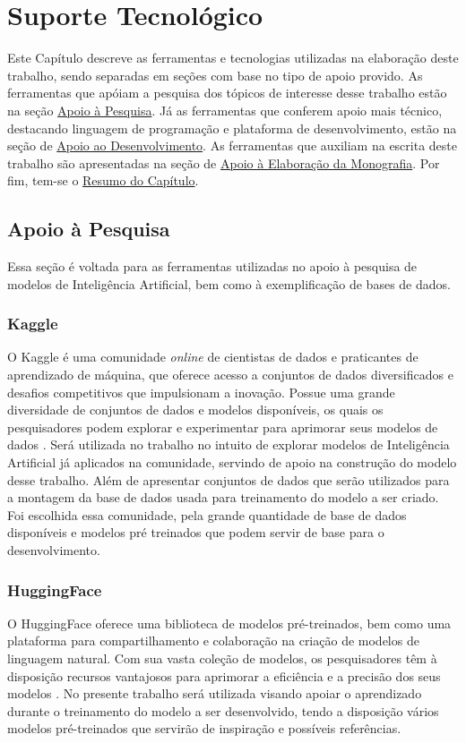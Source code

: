 \chapter[Suporte Tecnológico]{Suporte Tecnológico}

Este Capítulo descreve as ferramentas e tecnologias utilizadas na elaboração deste trabalho, sendo separadas
em seções com base no tipo de apoio provido. As ferramentas que apóiam a pesquisa dos tópicos de interesse desse 
trabalho estão na seção
\hyperref[sec:apoiopesquisa]{Apoio à Pesquisa}. Já as ferramentas que conferem apoio mais técnico, destacando linguagem
de programação e plataforma de desenvolvimento, estão na seção de \hyperref[sec:apoiodev]{Apoio ao Desenvolvimento}.
As ferramentas que auxiliam na escrita deste trabalho são apresentadas na seção de \hyperref[sec:elaboracaomono]
{Apoio à Elaboração da Monografia}. Por fim, tem-se o \hyperref[sec:resumosuptec]
{Resumo do Capítulo}.

\section{Apoio à Pesquisa}\label{sec:apoiopesquisa}
Essa seção é voltada para as ferramentas utilizadas no apoio à pesquisa de modelos de Inteligência Artificial, bem
como à exemplificação de bases de dados.

\subsection{Kaggle}\label{subsec:kaggle}
O Kaggle é uma comunidade \textit{online} de cientistas de dados e praticantes de aprendizado de máquina, que 
oferece acesso a conjuntos de dados diversificados e desafios competitivos que impulsionam a inovação. Possue 
uma grande diversidade de conjuntos de dados e modelos disponíveis, os quais os pesquisadores podem explorar e 
experimentar para aprimorar seus modelos de dados \cite{kagglesite}. Será utilizada no trabalho no intuito de explorar
modelos de Inteligência Artificial já aplicados na comunidade, servindo de apoio na construção do modelo desse trabalho.
Além de apresentar conjuntos de dados que serão utilizados para a montagem da base de dados usada para treinamento do modelo 
a ser criado. Foi escolhida essa comunidade, pela grande quantidade de base de dados disponíveis e modelos pré treinados que 
podem servir de base para o desenvolvimento. 

\subsection{HuggingFace}\label{subsec:huggingface}
O HuggingFace oferece uma biblioteca de modelos pré-treinados, bem como uma plataforma para compartilhamento e 
colaboração na criação de modelos de linguagem natural. Com sua vasta coleção de modelos, os pesquisadores têm à 
disposição recursos vantajosos para aprimorar a eficiência e a precisão dos seus modelos \cite{huggingsite}. No presente trabalho será 
utilizada visando apoiar o aprendizado durante o treinamento do modelo a ser desenvolvido, tendo a disposição vários modelos
pré-treinados que servirão de inspiração e possíveis referências.

